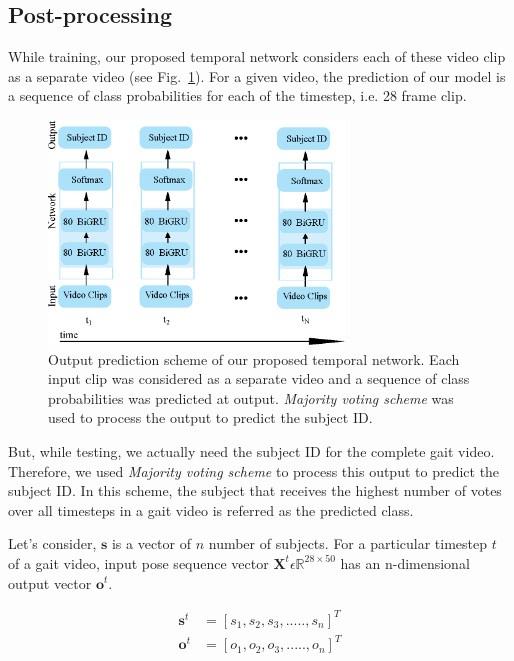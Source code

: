 \subsection{Post-processing}\label{subsec_post_process}
While training, our proposed temporal network considers each of these video clip as a separate video (see Fig.~\ref{fig:output_prediction}). For a given video, the prediction of our model is a sequence of class probabilities for each of the timestep, i.e. 28 frame clip.

\begin{figure}
	\centering
	\includegraphics[width=0.7\textwidth ]{figures/output_prediction.eps}
	\caption[Output prediction scheme of our proposed temporal network]{
		Output prediction scheme of our proposed temporal network. Each input clip was considered as a separate video and a sequence of class probabilities was predicted at output. \textit{Majority voting scheme }was used to process the output to predict the subject ID.
	}
	\label{fig:output_prediction}
\end{figure}

But, while testing, we actually need the subject ID for the complete gait video. Therefore, we used \textit {Majority voting scheme} to process this output to predict the subject ID. In this scheme, the subject that receives the highest number of votes over all timesteps in a  gait video is referred as the predicted class.

Let\rq s consider, $\boldsymbol{s}$ is a vector of $n$ number of subjects. For a particular timestep $t$ of a gait video, input pose sequence vector $\boldsymbol X^t \epsilon \mathbb {R}^{28\times 50}$ has an n-dimensional output vector $\boldsymbol o^t$.

\begin{equation} \label{equ:timestep_sequence}
\begin{split}
\boldsymbol s^t &=  {[s_1, s_2, s_3, ....., s_{n}]}^{T}\\
\boldsymbol o^t &=  {[o_1, o_2, o_3, ....., o_{n}]}^{T}
\end{split}
\end{equation}

